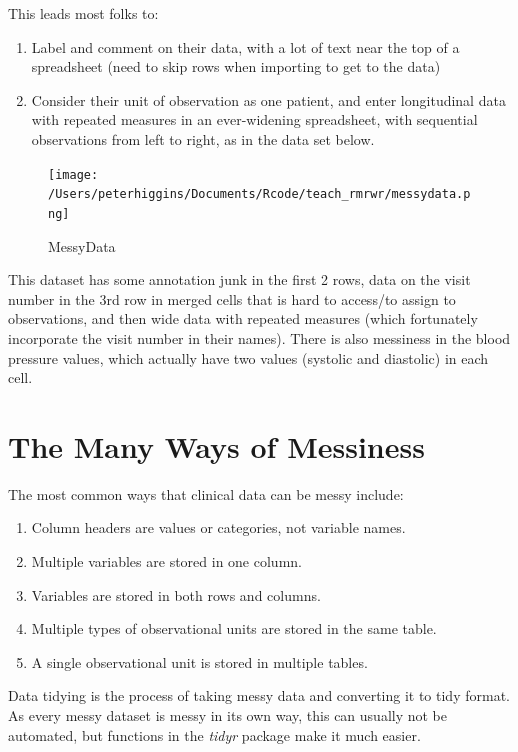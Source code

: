 \documentclass[
]{book}
\providecommand{\tightlist}{%
  \setlength{\itemsep}{0pt}\setlength{\parskip}{0pt}}
\begin{document}
This leads most folks to:

\begin{enumerate}
\def\labelenumi{\arabic{enumi}.}
\tightlist
\item
  Label and comment on their data, with a lot of text near the top of a spreadsheet (need to skip rows when importing to get to the data)
\item
  Consider their unit of observation as one patient, and enter longitudinal data with repeated measures in an ever-widening spreadsheet, with sequential observations from left to right, as in the data set below.
\end{enumerate}

\begin{figure}
\centering
\texttt{[image: /Users/peterhiggins/Documents/Rcode/teach\_rmrwr/messydata.png]}
\caption{MessyData}
\end{figure}

This dataset has some annotation junk in the first 2 rows,
data on the visit number in the 3rd row in merged cells that is hard to access/to assign to observations, and then wide data with repeated measures (which fortunately incorporate the visit number in their names). There is also messiness in the blood pressure values, which actually have two values (systolic and diastolic) in each cell.

\hypertarget{the-many-ways-of-messiness}{%
\section{The Many Ways of Messiness}\label{the-many-ways-of-messiness}}

The most common ways that clinical data can be messy include:

\begin{enumerate}
\def\labelenumi{\arabic{enumi}.}
\tightlist
\item
  Column headers are values or categories, not variable names.
\item
  Multiple variables are stored in one column.
\item
  Variables are stored in both rows and columns.
\item
  Multiple types of observational units are stored in the same table.
\item
  A single observational unit is stored in multiple tables.
\end{enumerate}

Data tidying is the process of taking messy data and converting it to tidy format. As every messy dataset is messy in its own way, this can usually not be automated, but functions in the \emph{tidyr} package make it much easier.
\end{document}
